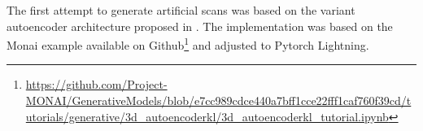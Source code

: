 The first attempt to generate artificial scans was based on the variant autoencoder architecture proposed in \cite{rombach2022high}. The implementation was based on the Monai\cite{Cardoso_MONAI_An_open-source_2022} example available on Github\footnote{\url{https://github.com/Project-MONAI/GenerativeModels/blob/e7cc989cdce440a7bff1cce22fff1caf760f39cd/tutorials/generative/3d_autoencoderkl/3d_autoencoderkl_tutorial.ipynb}} and adjusted to Pytorch Lightning.








